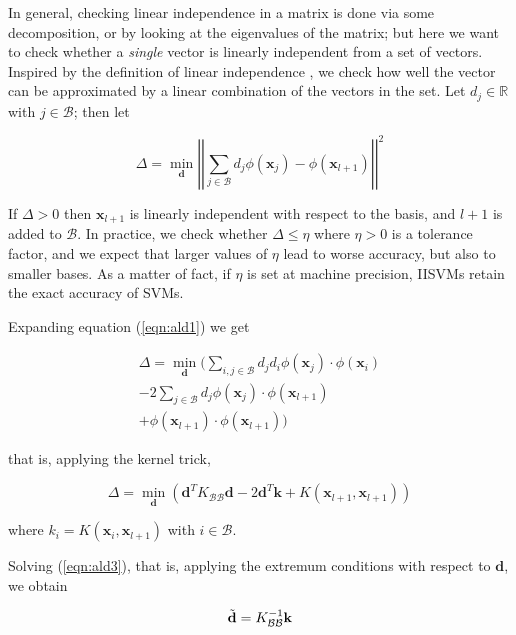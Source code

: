 \documentclass[10pt,twocolumn,letterpaper]{article}
\def\RR{\mathbb{R}}
\def\xx{\mathbf{x}}
\def\dd{\mathbf{d}}
\def\mdd{\tilde{\dd}}
\def\b{\mathcal{B}}
\begin{document}
In general, checking linear independence in a matrix is done via some
decomposition, or by looking at the eigenvalues of the matrix; but
here we want to check whether a \emph{single} vector is linearly
independent from a set of vectors. Inspired by the definition of
linear independence \cite{EngelMM02sparse}, we check how well the
vector can be approximated by a linear combination of the vectors in
the set. Let $d_j \in \RR$ with $j \in \b$; then let

\begin{equation} \label{eqn:ald1}
  \Delta = \min_\dd \left|\left|\sum_{j \in \b} d_j \phi(\xx_j) - \phi(\xx_{l+1}) \right|\right|^2
\end{equation}

If $\Delta > 0$ then $\xx_{l+1}$ is linearly independent with respect
to the basis, and $l+1$ is added to $\b$. In practice, we check
whether $\Delta \leq \eta$ where $\eta > 0$ is a tolerance factor, and
we expect that larger values of $\eta$ lead to worse accuracy, but also
to smaller bases. As a matter of fact, if $\eta$ is set at machine
precision, IISVMs retain the exact accuracy of SVMs.

Expanding equation (\ref{eqn:ald1}) we get

\begin{eqnarray} \label{eqn:ald2}
  \Delta = \min_{\dd} (
      \sum_{i,j \in \b} d_j d_i \phi(\xx_j) \cdot \phi(\xx_i) \\
    - 2\sum_{j \in \b} d_j \phi(\xx_j) \cdot \phi(\xx_{l+1}) \nonumber \\
    + \phi(\xx_{l+1}) \cdot \phi(\xx_{l+1}) ) \nonumber
\end{eqnarray}

that is, applying the kernel trick,

\begin{equation} \label{eqn:ald3}
  \Delta = \min_{\dd} \left(
      \dd^T K_{\b\b}\dd
    - 2 \dd^T \mathbf{k}
    + K(\xx_{l+1},\xx_{l+1})
  \right)
\end{equation}

where $k_i = K(\xx_i,\xx_{l+1})$ with $i \in \b$.

Solving (\ref{eqn:ald3}), that is, applying the extremum conditions
with respect to $\dd$, we obtain

\begin{equation} \label{eqn:ald4}
  \mdd = K_{\b\b}^{-1} \mathbf{k} \\
\end{equation}
\end{document}
